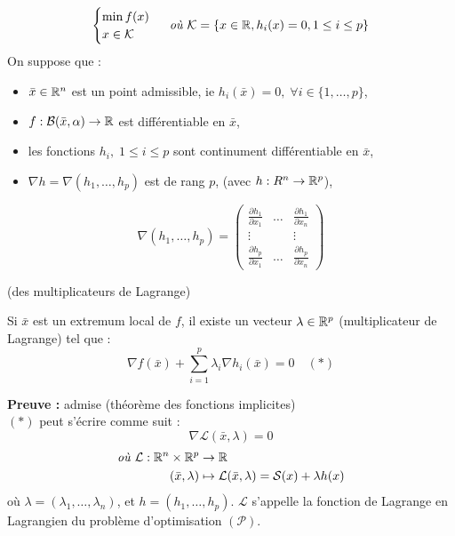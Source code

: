 \[ \begin{cases} \min f(x) \\ x\in \mathcal{K} \end{cases} \textit{ où }\mathcal{K}=\{x\in\mathbb{R},h_i(x)=0, 1\leq i\leq p \} \]
On suppose que : 
\begin{itemize}
\item $\bar{x}\in\mathbb{R}^n$ est un point admissible, ie $h_i(\bar{x})=0, \;\forall i\in\{1,\dots,p\}$,
\item $f:\mathcal{B}(\bar{x},\alpha)\rightarrow \mathbb{R}$ est différentiable en $\bar{x}$,
\item les fonctions $h_i, \;1\leq i\leq p$ sont continument différentiable en $\bar{x}$,
\item $\nabla h=\nabla(h_1, \dots,h_p)$ est de rang $p$, (avec $h:R^n\rightarrow\mathbb{R}^p$),
\end{itemize}
\[ \nabla(h_1, \dots,h_p)=\begin{pmatrix} \frac{\partial h_1}{\partial x_1} & \hdots & \frac{\partial h_1}{\partial x_n}\\ \vdots &  & \vdots\\ \frac{\partial h_p}{\partial x_1} & \hdots & \frac{\partial h_p}{\partial x_n} \end{pmatrix}\]

\begin{theoreme} (des multiplicateurs de Lagrange)

Si $\bar{x}$ est un extremum local de $f$, il existe un vecteur $\lambda\in\mathbb{R}^p$ (multiplicateur de Lagrange) tel que : \[ \nabla f(\bar{x})+\sum_{i=1}^p\lambda_i\nabla h_i(\bar{x})=0 \quad (*)\]
\end{theoreme}

\textbf{Preuve :} admise (théorème des fonctions implicites)\\
$(*)$ peut s'écrire comme suit : \[ \nabla \mathcal{L}(\bar{x},\lambda)=0 \]
\begin{align*} \textit{où } \mathcal{L}:\mathbb{R}^n\times\mathbb{R}^p&\rightarrow \mathbb{R} \\ (\bar{x},\lambda)&\mapsto \mathcal{L}(\bar{x},\lambda)=\mathcal{S}(x)+\lambda h(x) \end{align*}
où $\lambda=(\lambda_1, \dots,\lambda_n)$, et $h=(h_1,\dots,h_p)$. $\mathcal{L}$ s'appelle la fonction de Lagrange en Lagrangien du problème d'optimisation $(\mathcal{P})$.

